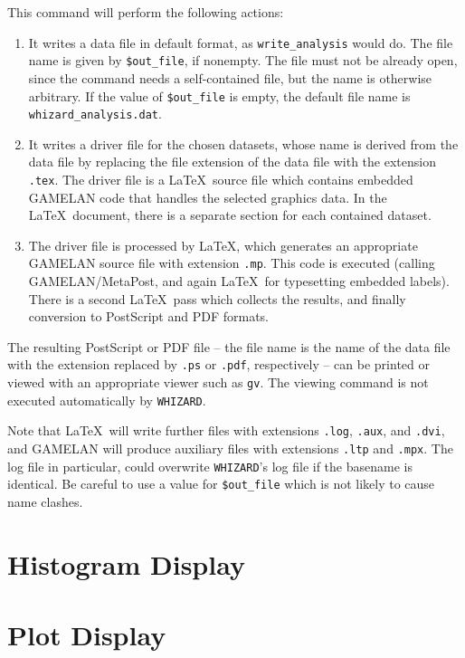 \documentclass[12pt]{book}
\newcommand{\ttt}[1]{\texttt{#1}}
\newcommand{\whizard}{\texttt{WHIZARD}}
\begin{document}
This command will perform the following actions:
\begin{enumerate}
\item
  It writes a data file in default format, as \ttt{write\_analysis} would do.
  The file name is given by \ttt{\$out\_file}, if nonempty.  The file must not
  be already open, since the command needs a self-contained file, but the name
  is otherwise arbitrary.  If the value of \ttt{\$out\_file} is empty, the
  default file name is \ttt{whizard\_analysis.dat}.
\item
  It writes a driver file for the chosen datasets, whose name is derived from
  the data file by replacing the file extension of the data file with the
  extension \ttt{.tex}.  The driver file is a \LaTeX\ source file which
  contains embedded GAMELAN code that handles the selected graphics data.  In
  the \LaTeX\ document, there is a separate section for each contained
  dataset.
\item
  The driver file is processed by \LaTeX, which generates an appropriate
  GAMELAN source file with extension \ttt{.mp}.  This code is executed
  (calling GAMELAN/MetaPost, and again \LaTeX\ for typesetting embedded
  labels).  There is a second \LaTeX\ pass which collects the results, and
  finally conversion to PostScript and PDF formats.
\end{enumerate}

The resulting PostScript or PDF file -- the file name is the name of the data
file with the extension replaced by \ttt{.ps} or \ttt{.pdf}, respectively
-- can be printed or viewed with an appropriate viewer such as \ttt{gv}.  The
viewing command is not executed automatically by \whizard.

Note that \LaTeX\ will write further files with extensions \ttt{.log},
\ttt{.aux}, and \ttt{.dvi}, and GAMELAN will produce auxiliary files with
extensions \ttt{.ltp} and \ttt{.mpx}. The log file in particular, could
overwrite \whizard's log file if the basename is identical.  Be careful to use
a value for \ttt{\$out\_file} which is not likely to cause name clashes.


\section{Histogram Display}


\section{Plot Display}
\end{document}
